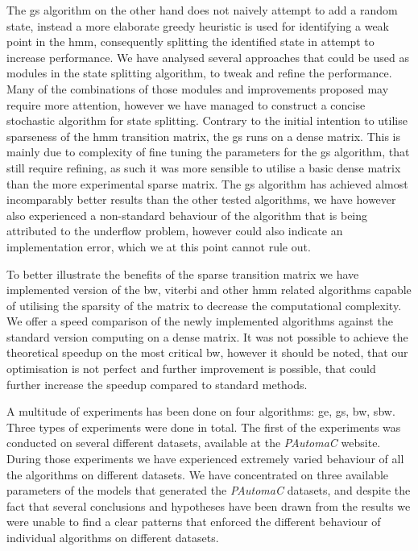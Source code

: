 The \acrlong{gs} algorithm on the other hand does not naively attempt to add a random state, instead a more elaborate greedy heuristic is used for identifying a weak point in the \gls{hmm}, consequently splitting the identified state in attempt to increase performance. We have analysed several approaches that could be used as modules in the state splitting algorithm, to tweak and refine the performance. Many of the combinations of those modules and improvements proposed may require more attention, however we have managed to construct a concise stochastic algorithm for state splitting. Contrary to the initial intention to utilise sparseness of the \gls{hmm} transition matrix, the \gls{gs} runs on a dense matrix. This is mainly due to complexity of fine tuning the parameters for the \gls{gs} algorithm, that still require refining, as such it was more sensible to utilise a basic dense matrix than the more experimental sparse matrix. The \gls{gs} algorithm has achieved almost incomparably better results than the other tested algorithms, we have however also experienced a non-standard behaviour of the algorithm that is being attributed to the underflow problem, however could also indicate an implementation error, which we at this point cannot rule out.

To better illustrate the benefits of the sparse transition matrix we have implemented version of the \gls{bw}, \gls{viterbi} and other \gls{hmm} related algorithms capable of utilising the sparsity of the matrix to decrease the computational complexity. We offer a speed comparison of the newly implemented algorithms against the standard version computing on a dense matrix. It was not possible to achieve the theoretical speedup on the most critical \gls{bw}, however it should be noted, that our optimisation is not perfect and further improvement is possible, that could further increase the speedup compared to standard methods.

A multitude of experiments has been done on four algorithms: \acrlong{ge}, \acrlong{gs}, \acrlong{bw}, \acrlong{sbw}. Three types of experiments were done in total. The first of the experiments was conducted on several different datasets, available at the \emph{PAutomaC} website. During those experiments we have experienced extremely varied behaviour of all the algorithms on different datasets. We have concentrated on three available parameters of the models that generated the \emph{PAutomaC} datasets, and despite the fact that several conclusions and hypotheses have been drawn from the results we were unable to find a clear patterns that enforced the different behaviour of individual algorithms on different datasets.

